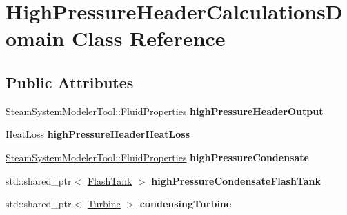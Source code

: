 \hypertarget{class_high_pressure_header_calculations_domain}{}\section{High\+Pressure\+Header\+Calculations\+Domain Class Reference}
\label{class_high_pressure_header_calculations_domain}
\subsection*{Public Attributes}
\begin{DoxyCompactItemize}
\item 
\mbox{\label{class_high_pressure_header_calculations_domain_aea8e0542907ef9210a3752034eabfef9}} 
\hyperlink{struct_steam_system_modeler_tool_1_1_fluid_properties}{Steam\+System\+Modeler\+Tool\+::\+Fluid\+Properties} {\bfseries high\+Pressure\+Header\+Output}
\item 
\mbox{\label{class_high_pressure_header_calculations_domain_aaf176d0367f6e9747e4130913a8c4984}} 
\hyperlink{class_heat_loss}{Heat\+Loss} {\bfseries high\+Pressure\+Header\+Heat\+Loss}
\item 
\mbox{\label{class_high_pressure_header_calculations_domain_a91c795de977f273018b1a9533833c019}} 
\hyperlink{struct_steam_system_modeler_tool_1_1_fluid_properties}{Steam\+System\+Modeler\+Tool\+::\+Fluid\+Properties} {\bfseries high\+Pressure\+Condensate}
\item 
\mbox{\label{class_high_pressure_header_calculations_domain_aaf7f3b5f364e4b328603704abc737748}} 
std\+::shared\+\_\+ptr$<$ \hyperlink{class_flash_tank}{Flash\+Tank} $>$ {\bfseries high\+Pressure\+Condensate\+Flash\+Tank}
\item 
\mbox{\label{class_high_pressure_header_calculations_domain_a67799caefd80d5d582776fcb09e780f5}} 
std\+::shared\+\_\+ptr$<$ \hyperlink{class_turbine}{Turbine} $>$ {\bfseries condensing\+Turbine}
\item 
\mbox{\label{class_high_pressure_header_calculations_domain_ae00fae0202945a84561013ee4aaa18b0}} 

\end{DoxyCompactItemize}
